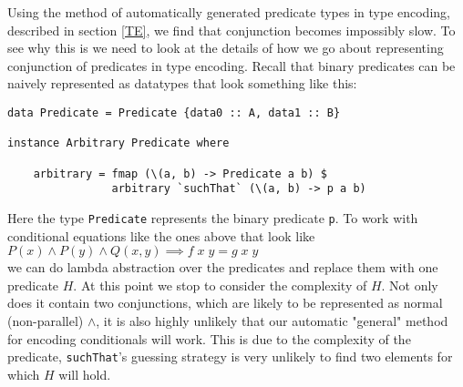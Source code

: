 Using the method of automatically generated predicate types in type encoding, described in section
\ref{TE}, we find that conjunction becomes impossibly slow. To see why this is we need to look at the
details of how we go about representing conjunction of predicates in type encoding. Recall that
binary predicates can be naively represented as datatypes that look something like this:
\begin{verbatim}data Predicate = Predicate {data0 :: A, data1 :: B}

instance Arbitrary Predicate where
    
    arbitrary = fmap (\(a, b) -> Predicate a b) $
                arbitrary `suchThat` (\(a, b) -> p a b)

\end{verbatim}
Here the type \texttt{Predicate} represents the binary predicate \texttt{p}.
To work with conditional equations like the ones above that look like
\\$P(x) \wedge P(y) \wedge Q(x, y)\implies f\;x\;y=g\;x\;y$\\
we can do lambda abstraction over the predicates and replace them with
one predicate $H$. At this point we stop to consider the complexity of $H$. Not only
does it contain two conjunctions, which are likely to be represented as normal (non-parallel) $\wedge$,
it is also highly unlikely that our automatic "general" method for encoding conditionals
will work. This is due to the complexity of the predicate, \texttt{suchThat}'s guessing strategy
is very unlikely to find two elements for which $H$ will hold.

